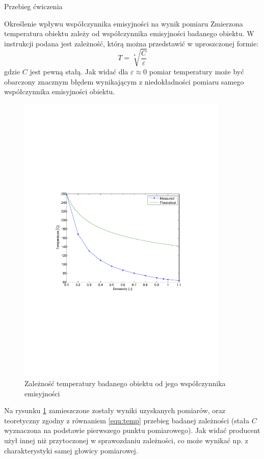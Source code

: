 \documentclass[12pt]{article}
\begin{document}
\begin{section}{Przebieg ćwiczenia}
\begin{subsection}{Określenie wpływu współczynnika emisyjności na wynik
	pomiaru}
		Zmierzona temperatura obiektu zależy od współczynnika emisyjności badanego
		obiektu. W instrukcji podana jest zależność, którą można przedstawić w
		uproszczonej formie:
		\begin{equation}
			T = \sqrt[4]{\dfrac{C}{\varepsilon}}
			\label{equ:temp}
		\end{equation}
		gdzie $C$ jest pewną stałą. Jak widać dla $\varepsilon \approx 0$ pomiar
		temperatury może być obarczony znacznym błędem wynikającym z niedokładności
		pomiaru samego współczynnika emisyjności obiektu.
		\begin{figure}[!htb]
			\begin{center}
				\includegraphics[trim=5cm 9cm 5cm 9cm,width=10cm]{../res/img/T_f(E).pdf} 
			\end{center}
			\caption{Zależność temperatury badanego obiektu od jego współczynnika
			emisyjności}
			\label{rys:pirE_T}
		\end{figure}
		
		Na rysunku \ref{rys:pirE_T} zamieszczone zostały wyniki uzyskanych pomiarów,
		oraz teoretyczny zgodny z równaniem \eqref{equ:temp} przebieg badanej
		zależności (stała $C$ wyznaczona na podstawie pierwszego punktu pomiarowego).
		Jak widać producent użył innej niż przytoczonej w sprawozdaniu zależności, co
		może wynikać np. z charakterystyki samej głowicy pomiarowej.
		

\end{subsection}
\end{section}
\end{document}
